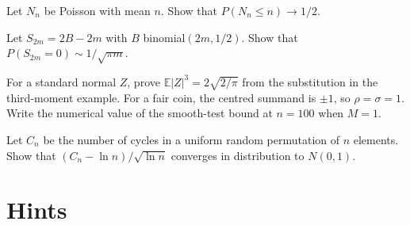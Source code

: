 \begin{exercise}[$\star\star$]\label{ex:poissonhalf}
Let $N_n$ be Poisson with mean $n$. Show that $P(N_n\le n)\to1/2$.
\end{exercise}

\begin{exercise}[$\star\star$]\label{ex:returns}
Let $S_{2m}=2B-2m$ with $B$ binomial$(2m,1/2)$. Show that $P(S_{2m}=0)\sim 1/\sqrt{\pi m}$.
\end{exercise}

\begin{exercise}[$\star\star$]\label{ex:thirdmoment}
For a standard normal $Z$, prove $\mathbb E|Z|^3=2\sqrt{2/\pi}$ from the substitution in the third-moment example. For a fair coin, the centred summand is $\pm 1$, so $\rho=\sigma=1$. Write the numerical value of the smooth-test bound at $n=100$ when $M=1$.
\end{exercise}

\begin{exercise}[$\star\star\star$]\label{ex:cyclesclt}
Let $C_n$ be the number of cycles in a uniform random permutation of $n$ elements. Show that $(C_n-\ln n)/\sqrt{\ln n}$ converges in distribution to $N(0,1)$.
\end{exercise}

\section{Hints}


